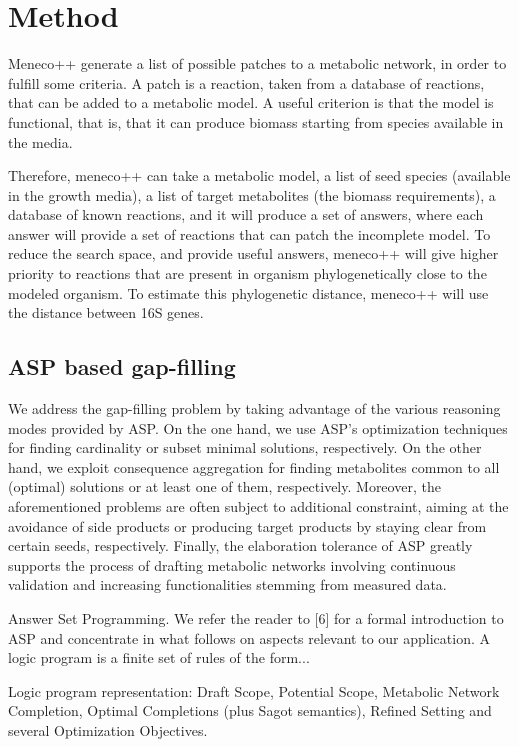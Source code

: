\documentclass{article}
\begin{document}
\section{Method}

Meneco++ generate a list of possible patches to a metabolic network, in order to fulfill some criteria. A patch is a reaction, taken from a database of reactions, that can be added to a metabolic model. A useful criterion is that the model is functional, that is, that it can produce biomass starting from species available in the media.

Therefore, meneco++ can take a metabolic model, a list of seed species (available in the growth media), a list of target metabolites (the biomass requirements), a database of known reactions, and it will produce a set of answers, where each answer will provide a set of reactions that can patch the incomplete model.
To reduce the search space, and provide useful answers, meneco++ will give higher priority to reactions that are present in organism phylogenetically close to the modeled organism. To estimate this phylogenetic distance, meneco++ will use the distance between 16S genes.


\subsection{ASP based gap-filling}


We address the gap-filling problem by taking advantage of the various reasoning modes provided by ASP. On the one hand, we use ASP’s optimization techniques for finding cardinality or subset minimal solutions, respectively. On the other hand, we exploit consequence aggregation for finding metabolites common to all (optimal) solutions or at least one of them, respectively. Moreover, the aforementioned problems are often subject to additional constraint, aiming at the avoidance of side products or producing target products by staying clear from certain seeds, respectively. Finally, the elaboration tolerance of ASP greatly supports the process of drafting metabolic networks involving continuous validation and increasing functionalities stemming from measured data.


Answer Set Programming. We refer the reader to [6] for a formal introduction to ASP and concentrate in what follows on aspects relevant to our application. A logic program is a finite set of rules of the form...

Logic program representation: Draft Scope, Potential Scope, Metabolic Network Completion, Optimal Completions (plus Sagot semantics), Refined Setting and several Optimization Objectives.
\end{document}
